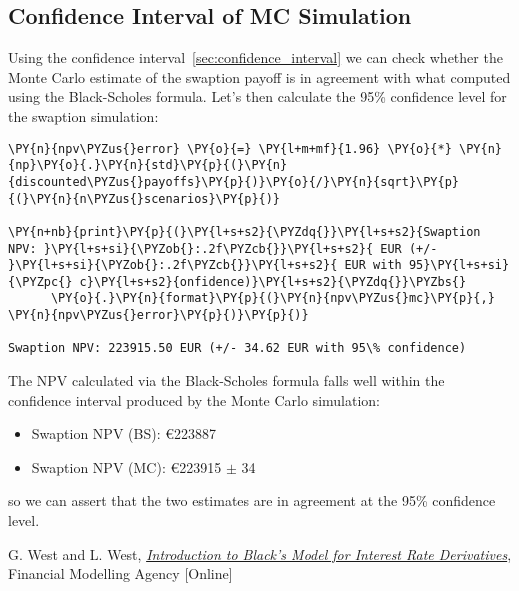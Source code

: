 %

\subsection{Confidence Interval of MC Simulation}

Using the confidence interval~\ref{sec:confidence_interval} we can check whether the Monte Carlo estimate of the swaption payoff is in agreement with what computed using the Black-Scholes formula.
Let's then calculate the 95\% confidence level for the swaption simulation:

\begin{codebox}[breakable, size=fbox, boxrule=1pt, pad at break*=1mm,colback=cellbackground, colframe=cellborder]
\begin{Verbatim}[commandchars=\\\{\}]
\PY{n}{npv\PYZus{}error} \PY{o}{=} \PY{l+m+mf}{1.96} \PY{o}{*} \PY{n}{np}\PY{o}{.}\PY{n}{std}\PY{p}{(}\PY{n}{discounted\PYZus{}payoffs}\PY{p}{)}\PY{o}{/}\PY{n}{sqrt}\PY{p}{(}\PY{n}{n\PYZus{}scenarios}\PY{p}{)}
				
\PY{n+nb}{print}\PY{p}{(}\PY{l+s+s2}{\PYZdq{}}\PY{l+s+s2}{Swaption NPV: }\PY{l+s+si}{\PYZob{}:.2f\PYZcb{}}\PY{l+s+s2}{ EUR (+/- }\PY{l+s+si}{\PYZob{}:.2f\PYZcb{}}\PY{l+s+s2}{ EUR with 95}\PY{l+s+si}{\PYZpc{} c}\PY{l+s+s2}{onfidence)}\PY{l+s+s2}{\PYZdq{}}\PYZbs{}
      \PY{o}{.}\PY{n}{format}\PY{p}{(}\PY{n}{npv\PYZus{}mc}\PY{p}{,} \PY{n}{npv\PYZus{}error}\PY{p}{)}\PY{p}{)}

Swaption NPV: 223915.50 EUR (+/- 34.62 EUR with 95\% confidence)
\end{Verbatim}
\end{codebox}

The NPV calculated via the Black-Scholes formula
falls well within the confidence interval produced by the Monte Carlo
simulation:

\begin{itemize}
\tightlist
\item
  Swaption NPV (BS): \euro{223887}
\item
  Swaption NPV (MC): \euro{223915} $\pm$ 34
\end{itemize}
so we can assert that the two estimates are in agreement at the 95\% confidence level.

\begin{thebibliography}{9}
	 G. West and L. West, \href{http://janroman.dhis.org/finance/Black/IntroToBlack.pdf}{\emph{Introduction to Black's Model for Interest Rate Derivatives}}, Financial Modelling Agency [Online]
\end{thebibliography}